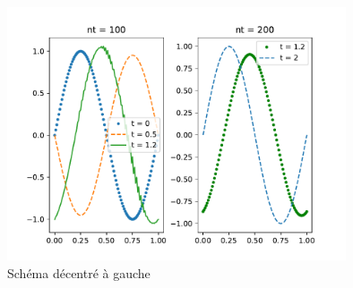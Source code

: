 \begin{figure}[h]
 \centering
 \includegraphics[width=10cm]{./Eequtransp_3.pdf}
 \caption{Schéma décentré à gauche}
 \label{fig: Eequtransp_3}
\end{figure}


